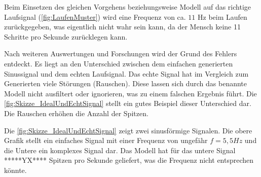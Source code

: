 Beim Einsetzen des gleichen Vorgehens beziehungsweise Modell auf das richtige Laufsignal (\autoref{fig:LaufenMuster}) wird eine Frequenz von ca. $11$ Hz beim Laufen zurückgegeben, was eigentlich nicht wahr sein kann, da der Mensch keine 11 Schritte pro Sekunde zurücklegen kann.

Nach weiteren Auswertungen und Forschungen wird der Grund des Fehlers entdeckt. Es liegt an den Unterschied zwischen dem einfachen generierten Sinussignal und dem echten Laufsignal. Das echte Signal hat im Vergleich zum Generierten viele Störungen (Rauschen). Diese lassen sich durch das benannte Modell nicht ausfiltert oder ignorieren, was zu einem falschen Ergebnis führt. Die \autoref{fig:Skizze_IdealUndEchtSignal} stellt ein gutes Beispiel dieser Unterschied dar. Die Rauschen erhöhen die Anzahl der Spitzen.

Die \autoref{fig:Skizze_IdealUndEchtSignal} zeigt zwei sinusförmige Signalen. Die obere Grafik stellt ein einfaches Signal mit einer Frequenz von ungefähr $f = 5,5 Hz$ und die Untere ein komplexes Signal dar.
Das Modell hat für das untere Signal *****YX**** Spitzen pro Sekunde geliefert, was die Frequenz nicht entsprechen könnte.

